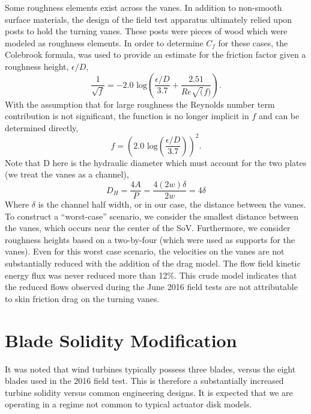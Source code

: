 Some roughness elements exist across the vanes. In addition to
non-smooth surface materials, the design of the field test apparatus
ultimately relied upon posts to hold the turning vanes. These posts were
pieces of wood which were modeled as roughness elements. In order to
determine $C_f$ for these cases, the Colebrook formula\cite{Colebrook367},
was used to provide an estimate for the friction factor given a
roughness height, $\epsilon/D$,  
\begin{equation}
 \frac{1}{\sqrt{f}} = -2.0 \text{ log}\left(\frac{\epsilon/D}{3.7} + \frac{2.51}{Re\sqrt(f)}\right).
\end{equation}
 With the assumption that for large roughness the Reynolds number term
 contribution is not significant, the function is no longer implicit in
 $f$ and can be determined directly, 
\begin{equation}
 f = \left(2.0 \text{ log}\left(\frac{\epsilon/D}{3.7}\right)\right)^2. 
\end{equation}
Note that D here is the hydraulic diameter which must account for the
two plates (we treat the vanes as a channel),
\begin{equation}
D_H = \frac{4 A}{P} = \frac{4 (2w)\delta}{2w} = 4 \delta
\end{equation}
Where $\delta$ is the channel half width, or in our case, the distance
between the vanes. To construct a ``worst-case'' scenario, we consider
the smallest distance between the vanes, which occurs near the center of
the SoV. Furthermore, we consider roughness heights based on a
two-by-four (which were used as supports for the
vanes). Even for this worst case scenario, the velocities on the vanes
are not substantially reduced with the addition of the drag model. The
flow field kinetic energy flux was never reduced more than 12\%. 
This crude model indicates that the reduced flows observed during the
June 2016 field tests are not attributable to skin friction drag on the
turning vanes.  


\section{Blade Solidity Modification}
\label{sec:solidity}
%
%
It was noted that wind turbines typically possess three blades, versus
the eight blades used in the 2016 field test. This is therefore a
substantially increased turbine solidity versus common engineering
designs. It is expected that we are operating in a regime not common to
typical actuator disk models. 

